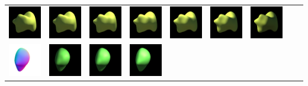 \begin{center}
\begin{longtable}{@{}c@{}c@{}c@{}c@{}c@{}c@{}c@{}c@{}c@{}}
\includegraphics[width=0.1\linewidth]{training/27_1.png} & \includegraphics[width=0.1\linewidth]{training/27_2.png} &
\includegraphics[width=0.1\linewidth]{training/27_3.png} & \includegraphics[width=0.1\linewidth]{training/27_4.png} &
\includegraphics[width=0.1\linewidth]{training/27_5.png} & \includegraphics[width=0.1\linewidth]{training/27_6.png} &
\includegraphics[width=0.1\linewidth]{training/27_7.png} \\
\includegraphics[width=0.1\linewidth]{training/28_gt.png} & \includegraphics[width=0.1\linewidth]{training/28_0.png} &
\includegraphics[width=0.1\linewidth]{training/28_1.png} & \includegraphics[width=0.1\linewidth]{training/28_2.png} &

\end{longtable}
\end{center}
